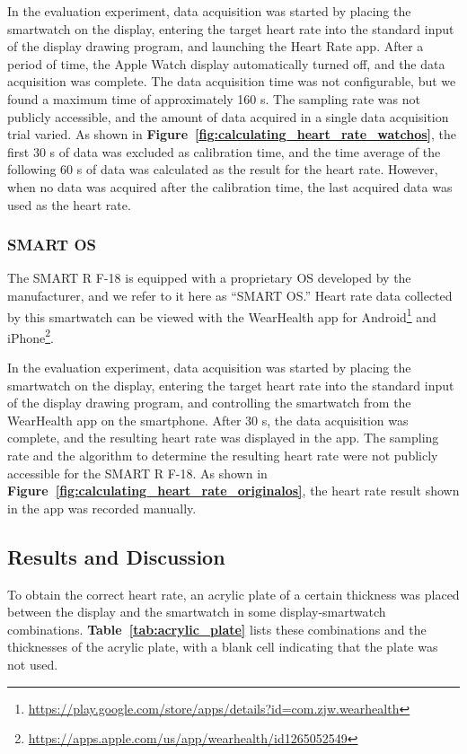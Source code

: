 \documentclass[sigchi,authordraft]{acmart}
\newcommand\figref[1]{\textbf{Figure~\ref{fig:#1}}}
\newcommand\tabref[1]{\textbf{Table~\ref{tab:#1}}}
\begin{document}
In the evaluation experiment, data acquisition was started by placing the smartwatch on the display, entering the target heart rate into the standard input of the display drawing program, and launching the Heart Rate app. After a period of time, the Apple Watch display automatically turned off, and the data acquisition was complete. The data acquisition time was not configurable, but we found a maximum time of approximately 160 s. The sampling rate was not publicly accessible, and the amount of data acquired in a single data acquisition trial varied. As shown in \figref{calculating_heart_rate_watchos}, the first 30 s of data was excluded as calibration time, and the time average of the following 60 s of data was calculated as the result for the heart rate. However, when no data was acquired after the calibration time, the last acquired data was used as the heart rate.

\subsubsection{SMART OS}
The SMART R F-18 is equipped with a proprietary OS developed by the manufacturer, and we refer to it here as ``SMART OS.'' Heart rate data collected by this smartwatch can be viewed with the WearHealth app for Android\footnote{\url{https://play.google.com/store/apps/details?id=com.zjw.wearhealth}} and iPhone\footnote{\url{https://apps.apple.com/us/app/wearhealth/id1265052549}}.\par

In the evaluation experiment, data acquisition was started by placing the smartwatch on the display, entering the target heart rate into the standard input of the display drawing program, and controlling the smartwatch from the WearHealth app on the smartphone. After 30 s, the data acquisition was complete, and the resulting heart rate was displayed in the app. The sampling rate and the algorithm to determine the resulting heart rate were not publicly accessible for the SMART R F-18. As shown in \figref{calculating_heart_rate_originalos}, the heart rate result shown in the app was recorded manually.


\subsection{Results and Discussion}
To obtain the correct heart rate, an acrylic plate of a certain thickness was placed between the display and the smartwatch in some display-smartwatch combinations. \tabref{acrylic_plate} lists these combinations and the thicknesses of the acrylic plate, with a blank cell indicating that the plate was not used.\par
\end{document}
